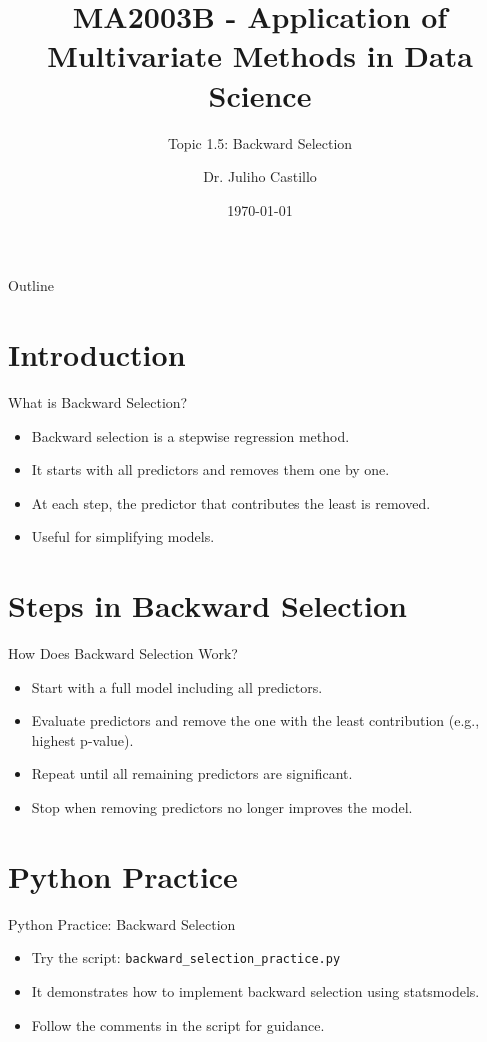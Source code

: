 \documentclass[aspectratio=169]{beamer}
\title[Backward Selection]{MA2003B - Application of Multivariate Methods in Data Science}
\subtitle{Topic 1.5: Backward Selection}
\author{Dr. Juliho Castillo}
\institute{Tec de Monterrey}
\date{\today}
\begin{document}
\begin{frame}
  \titlepage
\end{frame}

\begin{frame}{Outline}
  \tableofcontents
\end{frame}

\section{Introduction}
\begin{frame}{What is Backward Selection?}
  \begin{itemize}
    \item Backward selection is a stepwise regression method.
    \item It starts with all predictors and removes them one by one.
    \item At each step, the predictor that contributes the least is removed.
    \item Useful for simplifying models.
  \end{itemize}
\end{frame}

\section{Steps in Backward Selection}
\begin{frame}{How Does Backward Selection Work?}
  \begin{itemize}
    \item Start with a full model including all predictors.
    \item Evaluate predictors and remove the one with the least contribution (e.g., highest p-value).
    \item Repeat until all remaining predictors are significant.
    \item Stop when removing predictors no longer improves the model.
  \end{itemize}
\end{frame}

\section{Python Practice}
\begin{frame}{Python Practice: Backward Selection}
  \begin{itemize}
    \item Try the script: \texttt{backward\_selection\_practice.py}
    \item It demonstrates how to implement backward selection using statsmodels.
    \item Follow the comments in the script for guidance.
  \end{itemize}
\end{frame}
\end{document}
